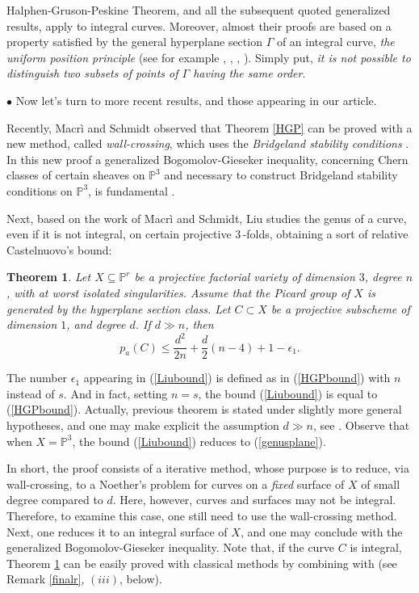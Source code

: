 \documentclass[9pt,a4paper]{amsart}
\theoremstyle{plain}
\newtheorem{theorem}{Theorem}[section]
\theoremstyle{definition}
\theoremstyle{remark}
\begin{document}
\smallskip
Halphen-Gruson-Peskine Theorem, and all  the subsequent quoted
generalized results, apply to integral curves. Moreover, almost their proofs
are based on a property satisfied by the general hyperplane section
$\Gamma$ of an integral curve, {\it the uniform position principle}
(see for example \cite{Harris1980}, \cite{EH}, \cite{CCD}, \cite{Ellia}). Simply
put, {\it it is not possible to distinguish two subsets of points of
$\Gamma$ having the same order}.


\smallskip
$\bullet$
Now let's turn to more recent results, and those appearing in our
article.

\smallskip
Recently, Macr\`i and Schmidt observed that
Theorem \ref{HGP}
can be proved with a new method,
called {\it wall-crossing}, which uses the {\it Bridgeland stability
conditions} \cite{Macri'S}. In this new proof a generalized  Bogomolov-Gieseker inequality,
concerning  Chern classes of certain sheaves on
$\mathbb P^3$ and necessary to construct Bridgeland stability conditions on $\mathbb P^3$,  is fundamental \cite{Macri'}.



Next, based on the work of Macr\`i and Schmidt, Liu studies the genus
of a curve, even if it is not integral, on certain projective
3\,-folds, obtaining a sort of relative Castelnuovo's bound:
\begin{theorem}\cite[Corollary 4.15]{Liu}\label{Liu}
Let $X\subseteq\mathbb P^r$ be a projective factorial  variety of
dimension $3$, degree $n$, with at
worst isolated singularities. Assume that the Picard group of $X$ is
generated by the hyperplane section class. Let $C\subset X$ be a projective
subscheme of dimension $1$, and degree $d$. If $d\gg n$, then
\begin{equation}\label{Liubound}
p_a(C)\leq \frac{d^2}{2n}+\frac{d}{2}(n-4)+1-\epsilon_1.
\end{equation}
\end{theorem}
The number $\epsilon_1$ appearing in (\ref{Liubound})   is defined
as in (\ref{HGPbound}) with $n$ instead of $s$. And in fact, setting
$n=s$, the bound (\ref{Liubound}) is equal to  (\ref{HGPbound}).
Actually, previous theorem is stated under slightly more general
hypotheses, and one may make explicit the assumption $d\gg n$, see
\cite[Theorem 4.9, Theorem 4.10, and Corollary 4.11]{Liu}. Observe that when
$X=\mathbb P^3$, the bound (\ref{Liubound}) reduces to
(\ref{genusplane}).

\smallskip
In short, the proof consists of a iterative method, whose purpose is to
reduce, via wall-crossing,
to a Noether's problem for curves on a {\it fixed} surface of $X$ of
small degree compared to $d$. Here, however, curves and surfaces
may not be integral. Therefore, to examine this case,
one still need to use the wall-crossing method.
Next, one reduces it to an
integral surface of $X$, and one may conclude  with the generalized
Bogomolov-Gieseker inequality.
Note that, if the curve $C$ is
integral, Theorem \ref{Liu} can be easily proved with
classical methods by combining \cite{CCD} with \cite{D3} (see
Remark \ref{finalr}, $(iii)$, below).
\end{document}
